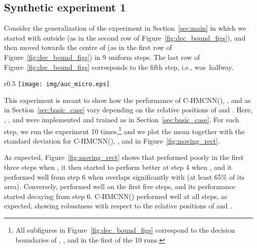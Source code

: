 \documentclass{article}
\newcommand{\system}[1]{C-HMCNN(#1)}
\newcommand{\auprc}{}
\begin{document}
\subsection{Synthetic experiment 1}
Consider the generalization of the experiment  in Section~\ref{sec:main} in which we started with  outside  (as in the second row of Figure~\ref{fig:dec_bound_figs}), and then moved  towards the centre of  (as in the first row of  Figure~\ref{fig:dec_bound_figs}) in 9 uniform steps.
The last row of  Figure~\ref{fig:dec_bound_figs} corresponds to the fifth step, i.e.,  was~halfway.
\begin{wrapfigure}{r}{0.5\textwidth}
     \vspace{-.5cm}
    \centering
    \texttt{[image: img/auc\_micro.eps]}
    \caption{Mean {\auprc} with standard deviation of \system{}, , and  for each step.\label{fig:moving_rect}}
    \vspace{-.45cm}
\end{wrapfigure}
This experiment is meant to show how the performance of \system{},  , and  as in Section~\ref{sec:basic_case}
vary depending on the relative positions of  and . Here, 
, , and  were implemented and trained as 
in Section~\ref{sec:basic_case}. For each step, we run the experiment 10 times,\footnote{All subfigures in Figure~\ref{fig:dec_bound_figs} correspond to the decision boundaries of , , and  in the first of the 10 runs. } and we plot the mean \auprc{} together with the standard deviation for \system{}, , and  in Figure~\ref{fig:moving_rect}.


As expected, Figure~\ref{fig:moving_rect} shows that  performed poorly in the first three steps when , it then started to perform better at step 4 when , and it performed well from step 6 when  overlaps significantly with  (at least 65\% of its area). Conversely,  performed well on the first five steps, and its performance started decaying from step 6. \system{} performed well at all steps, as expected, showing robustness with respect to the relative positions of  and . 
\end{document}
